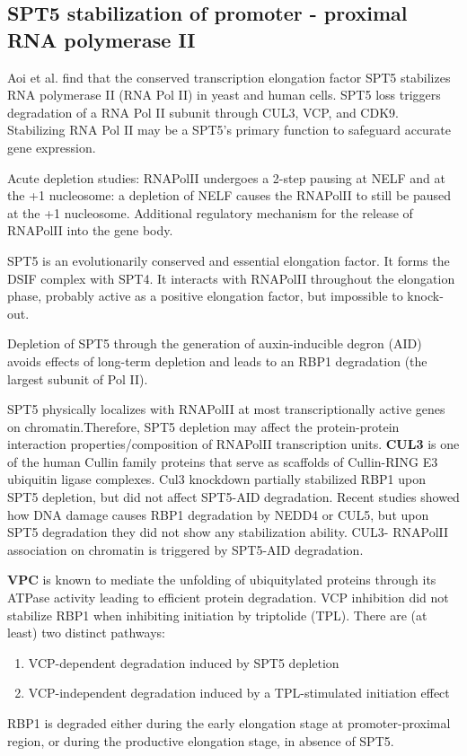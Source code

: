 \subsection{SPT5 stabilization of promoter - proximal RNA polymerase II}
Aoi et al. find that the conserved transcription elongation factor SPT5 stabilizes RNA polymerase II (RNA Pol II) in yeast and human
cells. SPT5 loss triggers degradation of a RNA Pol II subunit through CUL3, VCP, and CDK9. Stabilizing RNA Pol II may be a SPT5’s primary function to safeguard accurate gene expression.

Acute depletion studies: RNAPolII undergoes a 2-step pausing at NELF and at the +1 nucleosome: a depletion of NELF causes the RNAPolII to still be paused at the +1 nucleosome. Additional regulatory mechanism for the release of RNAPolII into the gene body.

SPT5 is an evolutionarily conserved and essential elongation factor. It forms the DSIF complex with SPT4. It interacts with RNAPolII throughout the elongation phase, probably active as a positive elongation factor, but impossible to knock-out.

Depletion of SPT5 through the generation of auxin-inducible degron (AID) avoids effects of long-term depletion and leads to an RBP1 degradation (the largest subunit of Pol II). 

SPT5 physically localizes with RNAPolII at most transcriptionally active genes on chromatin.Therefore, SPT5 depletion may affect the protein-protein interaction properties/composition of RNAPolII transcription units. \textbf{CUL3} is one of the human Cullin family proteins that serve as scaffolds of Cullin-RING E3 ubiquitin ligase complexes. Cul3 knockdown partially stabilized RBP1 upon SPT5 depletion, but did not affect SPT5-AID degradation. Recent studies showed how DNA damage causes RBP1 degradation by NEDD4 or CUL5, but upon SPT5 degradation they did not show any stabilization ability. CUL3- RNAPolII association on chromatin is triggered by SPT5-AID degradation.

\textbf{VPC} is known to mediate the unfolding of ubiquitylated proteins through its ATPase activity leading to efficient protein degradation.
VCP inhibition did not stabilize RBP1 when inhibiting initiation by triptolide (TPL).
There are (at least) two distinct pathways:
\begin{enumerate}
\item VCP-dependent degradation induced by SPT5 depletion
\item VCP-independent degradation induced by a TPL-stimulated initiation effect
\end{enumerate}
RBP1 is degraded either during the early elongation stage at promoter-proximal region, or during the productive elongation stage, in absence of SPT5.

